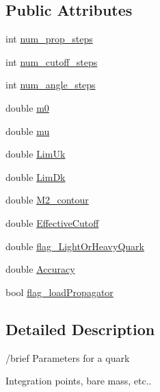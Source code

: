 \subsection*{Public Attributes}
\begin{DoxyCompactItemize}
\item 
int \hyperlink{class_c___quark__parameters_a60916d990db056834babfd4e515b30da}{num\-\_\-prop\-\_\-steps}
\item 
int \hyperlink{class_c___quark__parameters_a28d72426b45b7565713e83ecb42a2d1b}{num\-\_\-cutoff\-\_\-steps}
\item 
int \hyperlink{class_c___quark__parameters_ace76ec22c1f3697f2d17777fa9067657}{num\-\_\-angle\-\_\-steps}
\item 
double \hyperlink{class_c___quark__parameters_aa1f1f3fdad8ccc3c06a012143857599c}{m0}
\item 
double \hyperlink{class_c___quark__parameters_a156667c6701d2542b1a289de58b7b228}{mu}
\item 
double \hyperlink{class_c___quark__parameters_a39f7367e2451ea069cbf763413a800c9}{Lim\-Uk}
\item 
double \hyperlink{class_c___quark__parameters_af40abb13a9312b462c26b4cdd9b21a14}{Lim\-Dk}
\item 
double \hyperlink{class_c___quark__parameters_a86e798ef3a89285c0229612f612eb94f}{M2\-\_\-contour}
\item 
double \hyperlink{class_c___quark__parameters_a1648469ed688b8d25c1ce6a622b90ef7}{Effective\-Cutoff}
\item 
double \hyperlink{class_c___quark__parameters_ab8e384ddf5a6d722a768e7179c4e0c2e}{flag\-\_\-\-Light\-Or\-Heavy\-Quark}
\item 
double \hyperlink{class_c___quark__parameters_ac1e6225033703e6a438930d107df16a3}{Accuracy}
\item 
bool \hyperlink{class_c___quark__parameters_adb9de54db5fdb4d9d326e0d7cfba38a5}{flag\-\_\-load\-Propagator}
\end{DoxyCompactItemize}


\subsection{Detailed Description}
/brief Parameters for a quark

Integration points, bare mass, etc.. 

